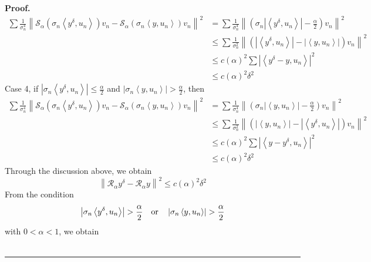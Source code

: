 \documentclass[a4paper,12pt]{article}
\numberwithin{equation}{section}
\newenvironment{proof}[1][Proof]{\textbf{#1.} }
{\ \rule{0.75em}{0.75em}\smallskip}
\begin{document}
\begin{proof}
    \begin{align*}
        \sum\frac{1}{\sigma_{n}^4}\left\|\mathcal{S}_{\alpha}(\sigma_{n}\left<y^{\delta},u_{n}\right>)v_{n} -\mathcal{S}_{\alpha}(\sigma_{n}\left<y,u_{n}\right>)v_{n}\right\|^{2}
        &  = \sum \frac{1}{\sigma_{n}^4}\left\|\left(\sigma_{n}\left|\left<y^{\delta},u_{n}\right>\right|- \frac{\alpha}{2}\right)v_{n}\right\|^{2} \\
        & \leq \sum \frac{1}{\sigma_{n}^2}\left\|\left(\left|\left<y^{\delta},u_{n}\right>\right|- \left|\left<y, u_{n}\right>\right|\right)v_{n}\right\|^{2} \\
        & \leq c\left(\alpha\right)^{2}\sum \left|\left<y^{\delta}-y,u_{n}\right>\right|^{2} \\
        & \leq c\left(\alpha\right)^{2}\delta^{2}
    \end{align*}
    Case 4, if $\left|\sigma_{n}\left<y^{\delta}, u_{n}\right>\right|\leq\frac{\alpha}{2}$ and $\left|\sigma_{n}\left<y, u_{n}\right>\right|>\frac{\alpha}{2}$, then
    \begin{align*}
        \sum\frac{1}{\sigma_{n}^4}\left\|\mathcal{S}_{\alpha}(\sigma_{n}\left<y^{\delta},u_{n}\right>)v_{n} -\mathcal{S}_{\alpha}(\sigma_{n}\left<y,u_{n}\right>)v_{n}\right\|^{2}
        &  = \sum \frac{1}{\sigma_{n}^4}\left\|\left(\sigma_{n}\left|\left<y,u_{n}\right>\right|- \frac{\alpha}{2}\right)v_{n}\right\|^{2} \\
        & \leq \sum \frac{1}{\sigma_{n}^2}\left\|\left(\left|\left<y,u_{n}\right>\right|- \left|\left<y^{\delta}, u_{n}\right>\right|\right)v_{n}\right\|^{2} \\
        & \leq c\left(\alpha\right)^{2} \sum \left|\left<y-y^{\delta},u_{n}\right>\right|^{2} \\
        & \leq c\left(\alpha\right)^{2}\delta^{2}
    \end{align*}
    Through the discussion above, we obtain
    \begin{equation}\label{equ3.20}
        \left\|\mathcal{R}_{\alpha}y^{\delta}-\mathcal{R}_{\alpha}y\right\|^{2}\leq c\left(\alpha\right)^{2}\delta^{2}
    \end{equation}
    From the condition 
    \begin{equation}\label{con1.1}
        \left|\sigma_{n}\left<y^{\delta}, u_{n}\right>\right|>\frac{\alpha}{2}\quad {\rm or}\quad \left|\sigma_{n}\left<y, u_{n}\right>\right|>\frac{\alpha}{2}
    \end{equation}
    with $0<\alpha<1$, we obtain
    \begin{equation*}

\end{equation*}
\end{proof}
\end{document}
